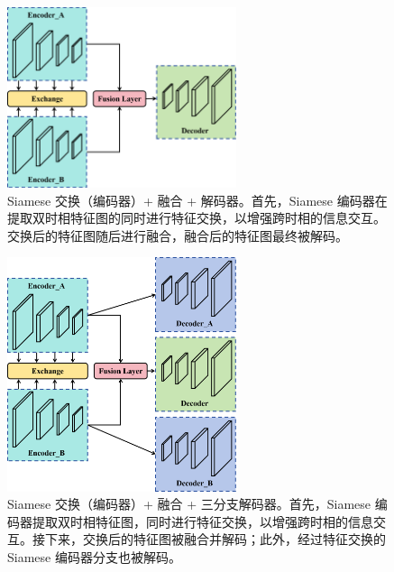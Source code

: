 \begin{figure}[!htbp]
  \centering
  \includegraphics[width=0.6\textwidth]{paper_figures/变化检测任务基础范式设计/SEED1b.png}
  \caption{Siamese 交换（编码器）+ 融合 + 解码器。首先，Siamese 编码器在提取双时相特征图的同时进行特征交换，以增强跨时相的信息交互。交换后的特征图随后进行融合，融合后的特征图最终被解码。}
  \label{fig:SEED1b}
\end{figure}

\begin{figure}[!htbp]
  \centering
  \includegraphics[width=0.6\textwidth]{paper_figures/变化检测任务基础范式设计/SEED1c.png}
  \caption{Siamese 交换（编码器）+ 融合 + 三分支解码器。首先，Siamese 编码器提取双时相特征图，同时进行特征交换，以增强跨时相的信息交互。接下来，交换后的特征图被融合并解码；此外，经过特征交换的 Siamese 编码器分支也被解码。}
  \label{fig:SEED1c}
\end{figure}

